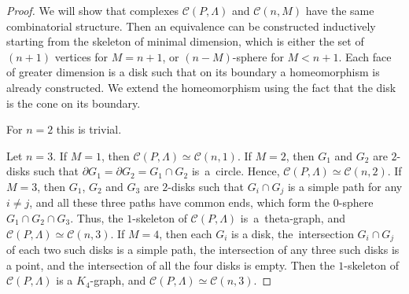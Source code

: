 \documentclass[10pt,a4paper]{amsart}
\begin{document}
\begin{proof}
We will show that complexes $\mathcal{C}(P,\Lambda)$ and $\mathcal{C}(n,M)$ have the same  
combinatorial structure. Then an equivalence can be constructed inductively starting from the skeleton
of minimal dimension, which is either the set of $(n+1)$ vertices for $M=n+1$, or $(n-M)$-sphere for $M<n+1$. 
Each face of greater dimension is a disk such that on its boundary a homeomorphism is already constructed. 
We extend the homeomorphism using the fact that the disk is the cone on its boundary.


For $n=2$ this is trivial. 

Let $n=3$. If $M=1$, then $\mathcal{C}(P,\Lambda)\simeq \mathcal{C}(n,1)$.  If $M=2$,
then $G_1$ and $G_2$ are $2$-disks such that $\partial G_1=\partial G_2=G_1\cap G_2$ is~a~circle. Hence,
$\mathcal{C}(P,\Lambda)\simeq \mathcal{C}(n,2)$. If $M=3$, then $G_1$, $G_2$ and $G_3$ are $2$-disks 
such that $G_i\cap G_j$ is a simple path for any $i\ne j$, and all these three paths have common ends,
which form the $0$-sphere $G_1\cap G_2\cap G_3$. Thus, the $1$-skeleton of $\mathcal{C}(P,\Lambda)$ is~a~theta-graph,
and $\mathcal{C}(P,\Lambda)\simeq \mathcal{C}(n,3)$. If $M=4$, then each $G_i$ is a disk, the~intersection 
$G_i\cap G_j$ of each two such disks is a simple path, the intersection of any three such disks is a point, and the intersection
of all the four disks is empty. Then the $1$-skeleton of $\mathcal{C}(P,\Lambda)$ is a $K_4$-graph, and  
$\mathcal{C}(P,\Lambda)\simeq \mathcal{C}(n,3)$.


\end{proof}
\end{document}
